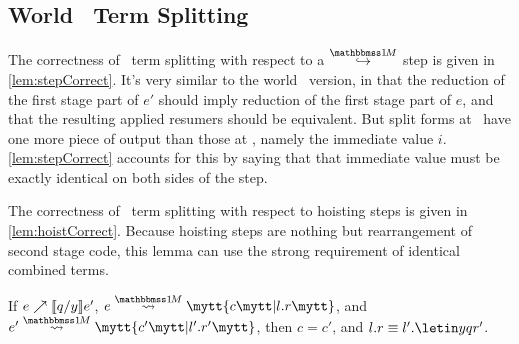 \begin{abstrsyn}




\subsection{World \bbonem\ Term Splitting}

The correctness of \bbonem\ term splitting with respect to a $\stepsym \bbonem$ step is given in \ref{lem:stepCorrect}.
It's very similar to the world \bbtwo\ version, 
in that the reduction of the first stage part of $e'$ should imply reduction of the first stage part of $e$,
and that the resulting applied resumers should be equivalent.
But split forms at \bbonem\ have one more piece of output than those at \bbtwo,
namely the immediate value $i$.
\ref{lem:stepCorrect} accounts for this by saying that 
that immediate value must be exactly identical on both sides of the step.

The correctness of \bbonem\ term splitting with respect to hoisting steps is given in \ref{lem:hoistCorrect}.
Because hoisting steps are nothing but rearrangement of second stage code,
this lemma can use the strong requirement of identical combined terms.

\begin{lemma} 
\label{lem:hoistCorrect}
If ${e}\nearrow \llbracket q/y \rrbracket{e'}$, $\splitone e A c {l.r}$, 
and $\splitone {e'} A {c'} {l'.r'}$, 
then $c = c'$, 
and $l.r \equiv l'.\letin y q {r'}$.
\end{lemma}


\end{abstrsyn}
